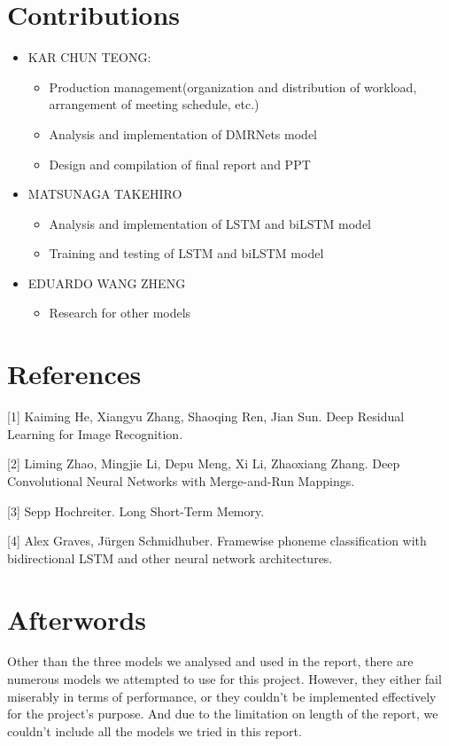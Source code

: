 \documentclass{article}
\begin{document}
\section{Contributions}
\begin{itemize}
\item KAR CHUN TEONG: 
\begin{itemize}
\item Production management(organization and distribution of workload, arrangement of meeting schedule, etc.)
\item Analysis and implementation of DMRNets model
\item Design and compilation of final report and PPT
\end{itemize}
\item MATSUNAGA TAKEHIRO
\begin{itemize}
\item Analysis and implementation of LSTM and biLSTM model
\item Training and testing of LSTM and biLSTM model
\end{itemize}
\item EDUARDO WANG ZHENG
\begin{itemize}
\item Research for other models
\end{itemize}
\end{itemize}

\section{References}
\medskip

\small

[1] Kaiming He, Xiangyu Zhang, Shaoqing Ren, Jian Sun. Deep Residual Learning for Image Recognition.

[2] Liming Zhao, Mingjie Li, Depu Meng, Xi Li, Zhaoxiang Zhang. Deep Convolutional Neural Networks with Merge-and-Run Mappings.

[3] Sepp Hochreiter. Long Short-Term Memory. 

[4] Alex Graves, Jürgen Schmidhuber. Framewise phoneme classification with bidirectional LSTM and other neural network architectures. 


\section{Afterwords}
Other than the three models we analysed and used in the report, there are numerous models we attempted to use for this project. However, they either fail miserably in terms of performance, or they couldn't be implemented effectively for the project's purpose. And due to the limitation on length of the report, we couldn't include all the models we tried in this report.
\end{document}
